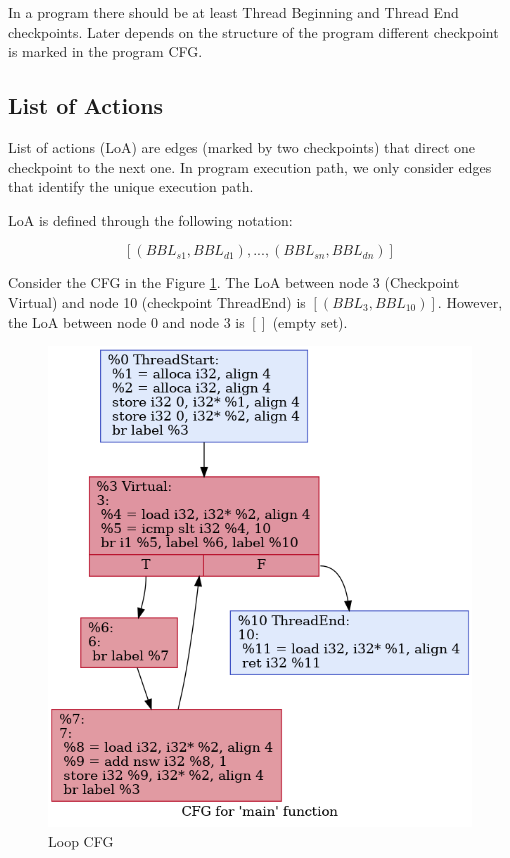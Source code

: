 In a program there should be at least Thread Beginning and Thread End checkpoints. Later depends on the structure of the program different checkpoint is marked in the program CFG.

\subsection{List of Actions}

List of actions (LoA) are edges (marked by two checkpoints) that direct one checkpoint to the next one. In program execution path, we only consider edges that identify the unique execution path.

LoA is defined through the following notation:

$$[(BBL_{s1},BBL_{d1}),...,(BBL_{sn},BBL_{dn})]$$

Consider the CFG in the Figure \ref{fig:4-5}. The LoA between node 3 (Checkpoint Virtual) and node 10 (checkpoint ThreadEnd) is  $[(BBL_3, BBL_{10})]$. However, the LoA between node 0 and node 3 is $[]$ (empty set).

\begin{figure}[htbp]
\centerline{\includegraphics[scale=.5]{Figures/loop-cfg.png}}
\caption{Loop CFG}
\label{fig:4-5}
\end{figure}

